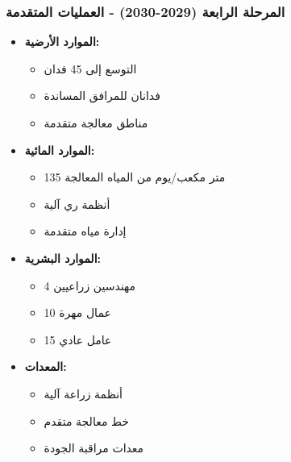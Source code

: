 \subsubsection{المرحلة الرابعة (2029-2030) - العمليات المتقدمة}
\begin{itemize}
    \item \textbf{الموارد الأرضية:}
    \begin{itemize}
        \item التوسع إلى 45 فدان
        \item فدانان للمرافق المساندة
        \item مناطق معالجة متقدمة
    \end{itemize}
    \item \textbf{الموارد المائية:}
    \begin{itemize}
        \item 135 متر مكعب/يوم من المياه المعالجة
        \item أنظمة ري آلية
        \item إدارة مياه متقدمة
    \end{itemize}
    \item \textbf{الموارد البشرية:}
    \begin{itemize}
        \item 4 مهندسين زراعيين
        \item 10 عمال مهرة
        \item 15 عامل عادي
    \end{itemize}
    \item \textbf{المعدات:}
    \begin{itemize}
        \item أنظمة زراعة آلية
        \item خط معالجة متقدم
        \item معدات مراقبة الجودة
    \end{itemize}
\end{itemize}

